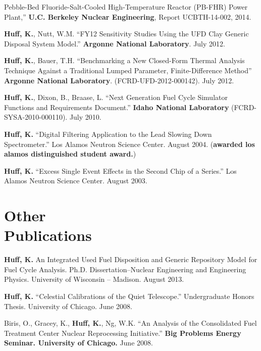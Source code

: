 \documentclass[margin,line]{resume}
\begin{document}
\begin{resume}
\begin{bibenum}
              Pebble-Bed Fluoride-Salt-Cooled High-Temperature Reactor (PB-FHR)
              Power Plant,'' \textbf{U.C. Berkeley Nuclear Engineering}, Report
              UCBTH-14-002, 2014.
      \item \textbf{Huff, K.}, Nutt, W.M. ``FY12 Sensitivity Studies Using the UFD Clay Generic Disposal System Model.''
        \textbf{Argonne National Laboratory}. July 2012.
      \item \textbf{Huff, K.}, Bauer, T.H. ``Benchmarking a New Closed-Form Thermal Analysis Technique Against a Traditional
        Lumped Parameter, Finite-Difference Method'' \textbf{Argonne National Laboratory}. (FCRD-UFD-2012-000142). July 2012.
      \item \textbf{Huff, K.}, Dixon, B., Braase, L. ``Next Generation Fuel Cycle Simulator Functions and Requirements Document.''
        \textbf{Idaho National Laboratory} (FCRD-SYSA-2010-000110). July 2010.
      \item \textbf{Huff, K.} ``Digital Filtering Application to the Lead Slowing Down
        Spectrometer.'' Los Alamos Neutron Science Center. August 2004.  %
        (\textbf{awarded los alamos distinguished student award.})
      \item \textbf{Huff, K.} ``Excess Single Event Effects in the Second Chip of a Series.''
        Los Alamos Neutron Science Center. August 2003.
    \end{bibenum}
    \section{\mysidestyle Other\\Publications}
    \begin{bibenum}
      \item \textbf{Huff, K.} An Integrated Used Fuel Disposition and Generic Repository Model for Fuel Cycle Analysis.
        Ph.D. Dissertation--Nuclear Engineering and Engineering
        Physics. University of Wisconsin -- Madison.  August 2013.
      \item \textbf{Huff, K.} ``Celestial Calibrations of the Quiet Telescope.''
        Undergraduate Honors Thesis. University of Chicago. June 2008.
      \item Biris, O., Gracey, K., \textbf{Huff, K.}, Ng, W.K.
        ``An Analysis of the Consolidated Fuel Treatment Center Nuclear
        Reprocessing Initiative.''
        \textbf{Big Problems Energy Seminar. University of Chicago.} June 2008.
    \end{bibenum}

\end{resume}
\end{document}

